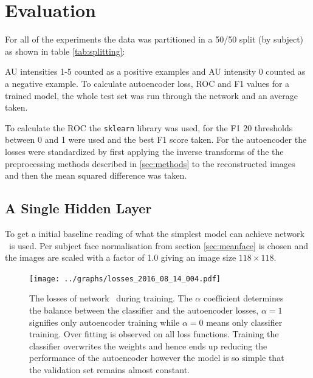 \chapter{Evaluation} \label{chap:Evaluation}

  For all of the experiments the data was partitioned in a 50/50 split
  (by subject) as shown in table \ref{tab:splitting}:
  \begin{table}[h!]
  \end{table}

  AU intensities 1-5 counted as a positive examples and AU intensity 0 counted as a negative example.
  To calculate autoencoder loss, ROC and F1 values for a trained model, the whole test
  set was run through the network and an average taken.

  To calculate the ROC the \texttt{sklearn} library was used, for the F1 20 thresholds
  between 0 and 1 were used and the best F1 score taken. For the autoencoder
  the losses were standardized by first applying the inverse transforms of the the preprocessing
  methods described in \ref{sec:methods} to the reconstructed images
  and then the mean squared difference was taken.

  \section{A Single Hidden Layer}

    To get a initial baseline reading of what the simplest model can achieve
    network \networkI\ is used. Per subject face normalisation from
    section \ref{sec:meanface} is chosen and the images are scaled with a factor of 1.0
    giving an image size $118 \times 118$.

    \begin{figure}[!h]
    \centering
    \texttt{[image: ../graphs/losses\_2016\_08\_14\_004.pdf]}
    \caption{The losses of network \networkI\ during training. The $\alpha$ coefficient determines the balance between the
    classifier and the autoencoder losses, $\alpha=1$ signifies only autoencoder training
    while $\alpha=0$ means only classifier training. Over fitting is observed
    on all loss functions. Training the classifier
    overwrites the weights and hence ends up reducing
    the performance of the autoencoder however the
    model is so simple that the validation set remains almost constant.}
    \label{fig:simpleloss}
    \end{figure}

